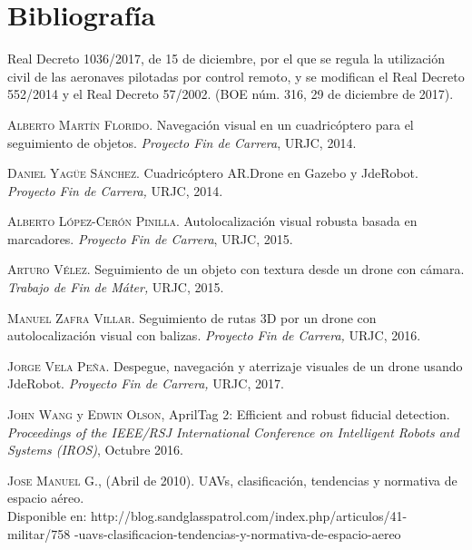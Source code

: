 \documentclass[a4paper, 12pt, oneside]{book}
\begin{document}
\chapter{Bibliografía}
\begin{thebibliography}{X}
 Real Decreto 1036/2017, de 15 de diciembre, por el que se regula la utilización 
civil  de  las  aeronaves  pilotadas  por  control  remoto,  y  se  modifican  el  Real  
Decreto 552/2014 y el Real Decreto 57/2002. (BOE núm. 316, 29 de diciembre de 2017).

 \textsc{Alberto Martín Florido.} Navegación visual en un cuadricóptero para el seguimiento de objetos. \textit{Proyecto Fin de Carrera}, URJC, 2014.	

 \textsc{Daniel Yagüe Sánchez.} Cuadricóptero AR.Drone en Gazebo y JdeRobot. \textit{Proyecto Fin de Carrera,} URJC, 2014.

 \textsc{Alberto López-Cerón Pinilla.} Autolocalización visual robusta basada en marcadores. \textit{Proyecto Fin de Carrera}, URJC, 2015.

 \textsc{Arturo Vélez.}  Seguimiento de un objeto con textura desde un drone con cámara. \textit{Trabajo de Fin de Máter,} URJC, 2015.

 \textsc{Manuel Zafra Villar.} Seguimiento de rutas 3D por un drone con autolocalización visual con balizas. \textit{Proyecto Fin de Carrera,} URJC, 2016.

 \textsc{Jorge Vela Peña.} Despegue, navegación y aterrizaje visuales de un drone usando JdeRobot. \textit{Proyecto Fin de Carrera,} URJC, 2017. 

 \textsc{John Wang} y \textsc{Edwin Olson}, AprilTag 2: Efficient and robust fiducial detection. \textit{Proceedings of the IEEE/RSJ International Conference on Intelligent Robots and Systems (IROS)}, Octubre 2016.
	
 \textsc{Jose Manuel G.}, (Abril de 2010). UAVs, clasificación, tendencias y normativa de espacio aéreo. \\ Disponible en: http://blog.sandglasspatrol.com/index.php/articulos/41-militar/758 -uavs-clasificacion-tendencias-y-normativa-de-espacio-aereo
\end{thebibliography} 
\end{document}
